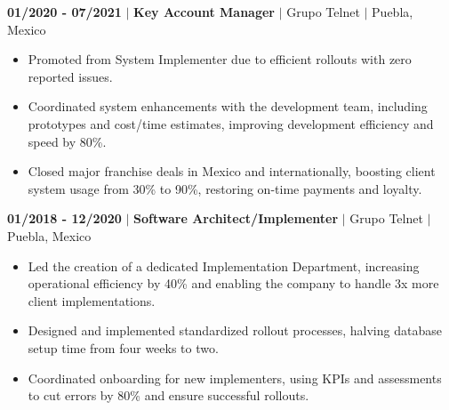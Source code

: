 \documentclass[a4paper,11pt]{article}
\begin{document}
\textbf{01/2020 - 07/2021} $|$ \textbf{Key Account Manager} $|$ Grupo Telnet  $|$ Puebla, Mexico
\begin{itemize}
\setlength{\itemsep}{-5pt}
    \item Promoted from System Implementer due to efficient rollouts with zero reported issues.
    \item Coordinated system enhancements with the development team, including prototypes and cost/time estimates, improving development efficiency and speed by 80\%.
    \item Closed major franchise deals in Mexico and internationally, boosting client system usage from 30\% to 90\%, restoring on-time payments and loyalty.
\end{itemize}

\textbf{01/2018 - 12/2020} $|$ \textbf{Software Architect/Implementer} $|$ Grupo Telnet  $|$ Puebla, Mexico

\begin{itemize}
\setlength{\itemsep}{-5pt}
    \item Led the creation of a dedicated Implementation Department, increasing operational efficiency by 40\% and enabling the company to handle 3x more client implementations.
    \item Designed and implemented standardized rollout processes, halving database setup time from four weeks to two.
    \item Coordinated onboarding for new implementers, using KPIs and assessments to cut errors by 80\% and ensure successful rollouts.
\end{itemize}
\end{document}
